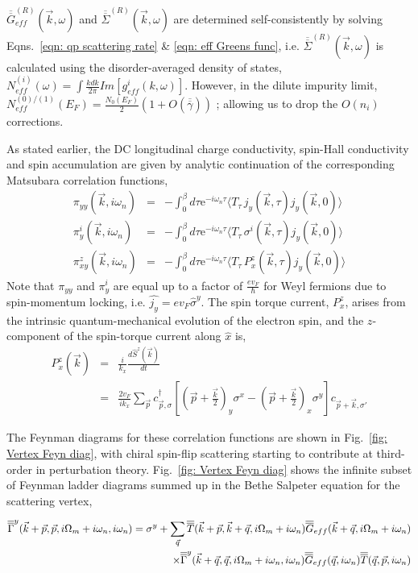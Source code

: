 \documentclass[twocolumn,epsfig,a4paper,amsmath,amssymb,showpacs,prl,superscriptaddress]{revtex4-1}
\newcommand{\ba}{\begin{eqnarray}}
\newcommand{\ea}{\end{eqnarray}}
\newcommand{\dg}{^{\dagger}}
\newcommand{\me}{\mathrm{e}}
\newcommand{\Gbar}{\overline{\overline{G}}}
\newcommand{\Tbar}{\overline{\overline{T}}}
\newcommand{\gbar}{\overline{\overline{\gamma}}}
\newcommand{\Gammabar}{\overline{\overline{\Gamma}}}
\begin{document}
$\Gbar^{(R)}_{eff}(\vec{k}, \omega)$ and $\overline{\overline{\Sigma}}^{(R)}(\vec{k}, \omega)$ are determined self-consistently by solving Eqns.~\ref{eqn: qp scattering rate} \& \ref{eqn: eff Greens func}, i.e. $\overline{\overline{\Sigma}}^{(R)}(\vec{k}, \omega)$ is calculated using the disorder-averaged density of states, $N^{(i)}_{eff}(\omega) = \int \frac{k dk}{2 \pi} Im \left[ g^{i}_{eff}(k, \omega) \right]$. However, in the dilute impurity limit, $N^{(0)/(1)}_{eff}(E_F) = \tfrac{N_{0}(E_F)}{2} (1 + O(\gbar))$ \cite{Rammer2004}; allowing us to drop the $O(n_i)$ corrections.

As stated earlier, the DC longitudinal charge conductivity, spin-Hall conductivity and spin accumulation are given by analytic continuation of the corresponding Matsubara correlation functions, 
%
\begin{subequations}
\ba
\label{eqn: pi_yy}
\pi_{yy}(\vec{k}, i \omega_n) & = & - \int^{\beta}_{0} d \tau \me^{-i \omega_n \tau} \langle T_{\tau } \, j_{y}(\vec{k}, \tau) j_{y}(\vec{k}, 0)  \rangle \\
\label{eqn: pi_iy}
\pi^{i}_{y}(\vec{k}, i \omega_n) & = & - \int^{\beta}_{0} d \tau \me^{-i \omega_n \tau} \langle T_{\tau} \, \sigma^i(\vec{k}, \tau) j_{y}(\vec{k}, 0)  \rangle \\
\label{eqn: pi_zxy}
\pi^{z}_{xy}(\vec{k}, i \omega_n) & = & -\int^{\beta}_{0} d \tau \me^{-i \omega_n \tau} \langle T_{\tau} \, P^{z}_{x}(\vec{k}, \tau) j_{y}(\vec{k}, 0)  \rangle
\ea
\end{subequations}
% 
Note that $\pi_{yy}$ and $\pi^{i}_{y}$ are equal up to a factor of $\tfrac{e v_F}{\hbar}$ for Weyl fermions due to spin-momentum locking, i.e. $\hat{j_y} = e v_F \hat{\sigma}^y$. The spin torque current, $P^{z}_x$, arises from the intrinsic quantum-mechanical evolution of the electron spin, and the $z$-component of the spin-torque current along $\hat{x}$ is,
%
\ba
\label{eqn: spin torque}
P^{z}_x(\vec{k}) & = & \tfrac{i}{k_x} \tfrac{d \hat{S}^z(\vec{k})}{d t} \\
 & = &\frac{2 v_F}{i k_x} \sum_{\vec{p}} c\dg_{\vec{p}, \sigma} \left[  \left( \vec{p} + \frac{\vec{k}}{2} \right)_{y}\sigma^x - \left( \vec{p} + \frac{\vec{k}}{2} \right)_{x} \sigma^y  \right] c_{\vec{p} + \vec{k}, \sigma'} \nonumber
\ea

The Feynman diagrams for these correlation functions are shown in Fig.~\ref{fig: Vertex Feyn diag}, with chiral spin-flip scattering starting to contribute at third-order in perturbation theory. Fig.~\ref{fig: Vertex Feyn diag} shows the infinite subset of Feynman ladder diagrams summed up in the Bethe Salpeter equation for the scattering vertex,
%
\begin{widetext}
\ba
\label{eqn: vertex Dyson eqn}
\Gammabar^{y}(\vec{k} + \vec{p}, \vec{p}, i \Omega_m + i \omega_n, i \omega_n) = \sigma^y + \sum_{\vec{q}} \Tbar(\vec{k} + \vec{p}, \vec{k} + \vec{q}, i \Omega_m + i \omega_n) \Gbar_{eff}(\vec{k}+\vec{q}, i \Omega_m + i \omega_n) \cr
 \times \Gammabar^{y}(\vec{k} + \vec{q}, \vec{q}, i \Omega_m + i \omega_n, i \omega_n) \Gbar_{eff}(\vec{q}, i \omega_n) \Tbar(\vec{q}, \vec{p}, i \omega_n)
\ea
\end{widetext}
\end{document}
